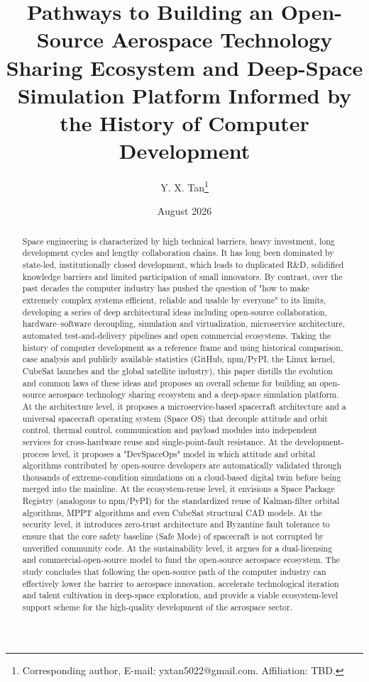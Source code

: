 \documentclass[11pt]{article}
\title{Pathways to Building an Open-Source Aerospace Technology Sharing Ecosystem and Deep-Space Simulation Platform Informed by the History of Computer Development}
\author{Y. X. Tan\thanks{Corresponding author, E-mail: yxtan5022@gmail.com. Affiliation: TBD.}}
\date{August 2026}
\begin{document}
\maketitle

\begin{abstract}
Space engineering is characterized by high technical barriers, heavy investment, long development cycles and lengthy collaboration chains. It has long been dominated by state-led, institutionally closed development, which leads to duplicated R\&D, solidified knowledge barriers and limited participation of small innovators. By contrast, over the past decades the computer industry has pushed the question of "how to make extremely complex systems efficient, reliable and usable by everyone" to its limits, developing a series of deep architectural ideas including open-source collaboration, hardware--software decoupling, simulation and virtualization, microservice architecture, automated test-and-delivery pipelines and open commercial ecosystems. Taking the history of computer development as a reference frame and using historical comparison, case analysis and publicly available statistics (GitHub, npm/PyPI, the Linux kernel, CubeSat launches and the global satellite industry), this paper distills the evolution and common laws of these ideas and proposes an overall scheme for building an open-source aerospace technology sharing ecosystem and a deep-space simulation platform. At the architecture level, it proposes a microservice-based spacecraft architecture and a universal spacecraft operating system (Space OS) that decouple attitude and orbit control, thermal control, communication and payload modules into independent services for cross-hardware reuse and single-point-fault resistance. At the development-process level, it proposes a "DevSpaceOps" model in which attitude and orbital algorithms contributed by open-source developers are automatically validated through thousands of extreme-condition simulations on a cloud-based digital twin before being merged into the mainline. At the ecosystem-reuse level, it envisions a Space Package Registry (analogous to npm/PyPI) for the standardized reuse of Kalman-filter orbital algorithms, MPPT algorithms and even CubeSat structural CAD models. At the security level, it introduces zero-trust architecture and Byzantine fault tolerance to ensure that the core safety baseline (Safe Mode) of spacecraft is not corrupted by unverified community code. At the sustainability level, it argues for a dual-licensing and commercial-open-source model to fund the open-source aerospace ecosystem. The study concludes that following the open-source path of the computer industry can effectively lower the barrier to aerospace innovation, accelerate technological iteration and talent cultivation in deep-space exploration, and provide a viable ecosystem-level support scheme for the high-quality development of the aerospace sector.
\end{abstract}
\end{document}
